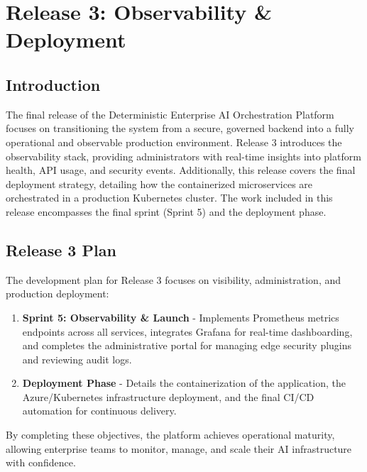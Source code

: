 \chapter{Release 3: Observability \& Deployment}

\section{Introduction}

The final release of the Deterministic Enterprise AI Orchestration Platform focuses on transitioning the system from a secure, governed backend into a fully operational and observable production environment. Release 3 introduces the observability stack, providing administrators with real-time insights into platform health, API usage, and security events. Additionally, this release covers the final deployment strategy, detailing how the containerized microservices are orchestrated in a production Kubernetes cluster. The work included in this release encompasses the final sprint (Sprint 5) and the deployment phase.

\section{Release 3 Plan}

The development plan for Release 3 focuses on visibility, administration, and production deployment:

\begin{enumerate}
    \item \textbf{Sprint 5: Observability \& Launch} - Implements Prometheus metrics endpoints across all services, integrates Grafana for real-time dashboarding, and completes the administrative portal for managing edge security plugins and reviewing audit logs.
    
    \item \textbf{Deployment Phase} - Details the containerization of the application, the Azure/Kubernetes infrastructure deployment, and the final CI/CD automation for continuous delivery.
\end{enumerate}

By completing these objectives, the platform achieves operational maturity, allowing enterprise teams to monitor, manage, and scale their AI infrastructure with confidence.

